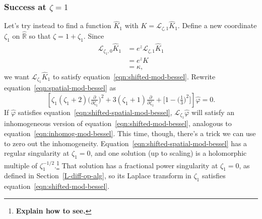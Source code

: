 \documentclass{article}
\newcommand{\R}{\mathbb{R}}
\newcommand{\laplace}{\mathcal{L}}
\begin{document}
\subsubsection{Success at $\zeta = 1$}\label{spatial-success}
Let's try instead to find a function $\hat{K}_1$ with $K = \laplace_{\zeta, 1} \hat{K}_1$. Define a new coordinate $\zeta_1$ on $\hat{\R}$ so that $\zeta = 1 + \zeta_1$. Since
\begin{align*}
\laplace_{\zeta_1, 0} \hat{K}_1 & = e^z \laplace_{\zeta, 1} \hat{K}_1 \\
& = e^z K \\
& = \kappa,
\end{align*}
we want $\laplace_{\zeta_1} \hat{K}_1$ to satisfy equation~\ref{eqn:shifted-mod-bessel}. Rewrite equation~\ref{eqn:spatial-mod-bessel} as
\begin{equation}\label{eqn:shifted-spatial-mod-bessel}
\left[\zeta_1(\zeta_1 + 2) \big(\tfrac{\partial}{\partial \zeta_1}\big)^2 + 3(\zeta_1 + 1) \tfrac{\partial}{\partial \zeta_1} + \big[1 - \big(\tfrac{1}{3}\big)^2\big]\right] \hat{\varphi} = 0.
\end{equation}
If $\hat{\varphi}$ satisfies equation~\ref{eqn:shifted-spatial-mod-bessel}, $\laplace_{\zeta_1} \hat{\varphi}$ will satisfy an inhomogeneous version of equation~\ref{eqn:shifted-mod-bessel}, analogous to equation~\ref{eqn:inhomog-mod-bessel}. This time, though, there's a trick we can use to zero out the inhomogeneity. Equation~\ref{eqn:shifted-spatial-mod-bessel} has a regular singularity at $\zeta_1 = 0$, and one solution (up to scaling) is a holomorphic multiple of $\zeta_1^{-1/2}$.\footnote{\textbf{Explain how to see.}} That solution has a fractional power singularity at $\zeta_1 = 0$, as defined in Section~\ref{L-diff-op-alg}, so its Laplace transform in $\zeta_1$ satisfies equation~\ref{eqn:shifted-mod-bessel}.
\end{document}
